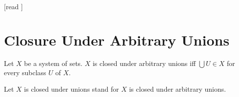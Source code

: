 \documentclass[10pt]{article}
\begin{document}
  \begin{imports}
    \begin{forthel}
      [read ]
    \end{forthel}
  \end{imports}


  \section*{Closure Under Arbitrary Unions}

  \begin{forthel}
    \begin{definition}[id=FOUNDATIONS_14_3959378992431104,printid]
      Let $X$ be a system of sets.
      $X$ is closed under arbitrary unions iff $\bigcup U \in X$ for every  subclass $U$ of $X$.
    \end{definition}

    Let $X$ is closed under unions stand for $X$ is closed under arbitrary unions.
  \end{forthel}
\end{document}
